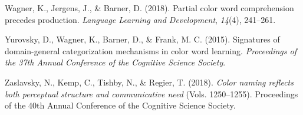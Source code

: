 \documentclass[
  ,apa7,floatsintext]{apa6}
\newlength{\cslhangindent}
\newlength{\cslentryspacingunit} %
\newenvironment{CSLReferences}[2] %
 {%
  \setlength{\parindent}{0pt}
  \ifodd #1
  \let\oldpar\par
  \def\par{\hangindent=\cslhangindent\oldpar}
  \fi
  \setlength{\parskip}{#2\cslentryspacingunit}
 }%
 {}
\begin{document}
\begin{CSLReferences}{1}{0}
\leavevmode{}%
Wagner, K., Jergens, J., \& Barner, D. (2018). Partial color word comprehension precedes production. \emph{Language Learning and Development}, \emph{14}(4), 241--261.

\leavevmode{}%
Yurovsky, D., Wagner, K., Barner, D., \& Frank, M. C. (2015). Signatures of domain-general categorization mechanisms in color word learning. \emph{Proceedings of the 37th Annual Conference of the Cognitive Science Society}.

\leavevmode{}%
Zaslavsky, N., Kemp, C., Tishby, N., \& Regier, T. (2018). \emph{Color naming reflects both perceptual structure and communicative need} (Vols. 1250--1255). Proceedings of the 40th Annual Conference of the Cognitive Science Society.

\end{CSLReferences}

\endgroup
\end{document}

